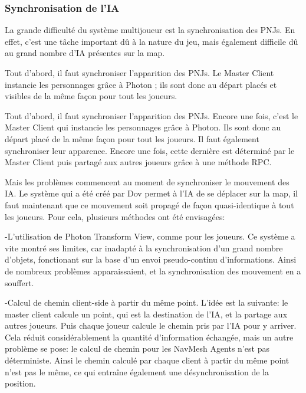     \subsubsection{Synchronisation de l'IA}

        La grande difficulté du système multijoueur est la synchronisation des PNJs. En effet, c'est une tâche important dû à la nature du jeu, 
        mais également difficile dû au grand nombre d'IA présentes sur la map.

        Tout d'abord, il faut synchroniser l'apparition des PNJs. Le Master Client instancie les personnages grâce à Photon ; ils sont donc au départ 
        placés et visibles de la même façon pour tout les joueurs.

        Tout d'abord, il faut synchroniser l'apparition des PNJs. Encore une fois, c'est le Master Client qui instancie les personnages
        grâce à Photon. Ils sont donc au départ placé de la même façon pour tout les joueurs. Il faut également synchroniser leur apparence.
        Encore une fois, cette dernière est déterminé par le Master Client puis partagé aux autres joueurs grâce à une méthode RPC.

        Mais les problèmes commencent au moment de synchroniser le mouvement des IA. Le système qui a été créé par Dov permet
        à l'IA de se déplacer sur la map, il faut maintenant que ce mouvement soit propagé de façon quasi-identique à tout les joueurs.
        Pour cela, plusieurs méthodes ont été envisagées:

            -L'utilisation de Photon Transform View, comme pour les joueurs. Ce système a vite montré ses limites, car inadapté à la synchronisation
            d'un grand nombre d'objets, fonctionant sur la base d'un envoi pseudo-continu d'informations. Ainsi de nombreux problèmes apparaissaient,
            et la synchronisation des mouvement en a souffert. 

            -Calcul de chemin client-side à partir du même point. L'idée est la suivante: le master client calcule un point, qui est la destination
            de l'IA, et la partage aux autres joueurs. Puis chaque joueur calcule le chemin pris par l'IA pour y arriver. Cela réduit considérablement la
            quantité d'information échangée, mais un autre problème se pose: le calcul de chemin pour les NavMesh Agents n'est pas déterministe. Ainsi le
            chemin calculé par chaque client à partir du même point n'est pas le même, ce qui entraîne également une désynchronisation de la position.

